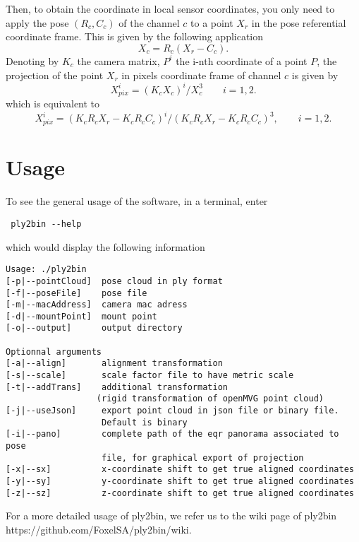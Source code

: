 \documentclass[a4paper, 11pt]{article}
\begin{document}
   \\
   \\
   Then, to obtain the coordinate in local sensor coordinates, you only need to apply the pose $(R_c, C_c)$ of the
   channel $c$ to a point $X_r$ in the pose referential coordinate frame. This is given by the following application
   \begin{equation}
       X_c = R_c (X_r - C_c).
   \end{equation}
   Denoting by $K_c$ the camera matrix, $P^i$ the i-nth coordinate of a point $P$, 
   the projection of the point $X_r$ in pixels coordinate frame of channel $c$ is given by
   \begin{equation}
        X_{pix}^i = (K_c X_c)^i / X_{c}^3 \qquad i=1,2.
   \end{equation}
   which is equivalent to 
   \begin{equation}
        X_{pix}^i = ( K_c R_c X_r - K_c R_c C_c )^i / ( K_c R_c X_r - K_c R_c C_c )^3, \qquad i=1,2.
   \end{equation}
   
 \section*{Usage}
 To see the general usage of the software, in a terminal, enter
\begin{verbatim}
 ply2bin --help
\end{verbatim}
   which would display the following information
 \begin{verbatim}
Usage: ./ply2bin
[-p|--pointCloud]  pose cloud in ply format
[-f|--poseFile]    pose file
[-m|--macAddress]  camera mac adress
[-d|--mountPoint]  mount point 
[-o|--output]      output directory
        
Optionnal arguments 
[-a|--align]       alignment transformation
[-s|--scale]       scale factor file to have metric scale
[-t|--addTrans]    additional transformation 
                  (rigid transformation of openMVG point cloud)
[-j|--useJson]     export point cloud in json file or binary file. 
                   Default is binary
[-i|--pano]        complete path of the eqr panorama associated to pose 
                   file, for graphical export of projection
[-x|--sx]          x-coordinate shift to get true aligned coordinates
[-y|--sy]          y-coordinate shift to get true aligned coordinates
[-z|--sz]          z-coordinate shift to get true aligned coordinates
 \end{verbatim}
   For a more detailed usage of ply2bin, we refer us to the wiki page of ply2bin https://github.com/FoxelSA/ply2bin/wiki.
    
\end{document}
